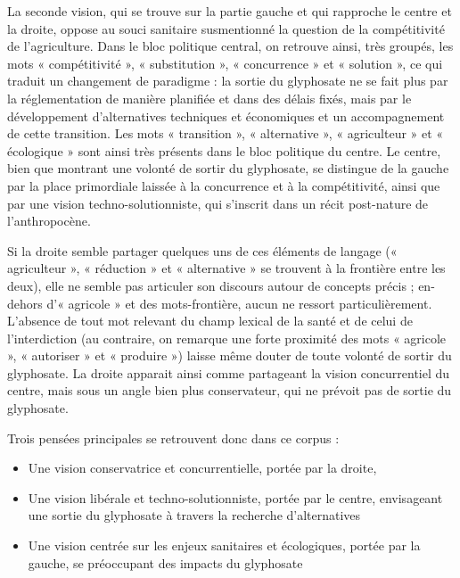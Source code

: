 \documentclass[12pt,twocolumn,landscape]{article}
\begin{document}
    La seconde vision, qui se trouve sur la partie gauche
    et qui rapproche le centre et la droite,
    oppose au souci sanitaire susmentionné la question
    de la compétitivité de l'agriculture.
    Dans le bloc politique central, on retrouve ainsi,
    très groupés, les mots « compétitivité »,
    « substitution », « concurrence » et « solution »,
    ce qui traduit un changement de paradigme :
    la sortie du glyphosate ne se fait plus par la réglementation
    de manière planifiée et dans des délais fixés,
    mais par le développement d'alternatives techniques
    et économiques et un accompagnement de cette transition.
    Les mots « transition », « alternative », « agriculteur »
    et « écologique » sont ainsi très présents
    dans le bloc politique du centre.
    Le centre, bien que montrant une volonté de sortir
    du glyphosate, se distingue de la gauche par
    la place primordiale laissée à la concurrence
    et à la compétitivité, ainsi que par une vision techno-solutionniste,
    qui s'inscrit dans un récit post-nature de l'anthropocène.

    Si la droite semble partager quelques uns de ces éléments de langage
    (« agriculteur », « réduction » et « alternative » se trouvent
    à la frontière entre les deux),
    elle ne semble pas articuler son discours autour
    de concepts précis ;
    en-dehors d'« agricole » et des mots-frontière,
    aucun ne ressort particulièrement.
    L'absence de tout mot relevant du champ lexical de la santé
    et de celui de l'interdiction (au contraire, on
    remarque une forte proximité des mots « agricole »,
    « autoriser » et « produire »)
    laisse même douter de toute volonté de sortir du glyphosate.
    La droite apparait ainsi comme partageant la vision
    concurrentiel du centre, mais sous un angle bien plus conservateur,
    qui ne prévoit pas de sortie du glyphosate.

    Trois pensées principales se retrouvent donc dans ce corpus :

    \begin{itemize}
        \item Une vision conservatrice et concurrentielle, portée
        par la droite,
        \item Une vision libérale et techno-solutionniste, portée par le centre,
        envisageant une sortie du glyphosate à travers la recherche d'alternatives
        \item Une vision centrée sur les enjeux sanitaires et écologiques, portée
        par la gauche, se préoccupant des impacts du glyphosate
    \end{itemize}
\end{document}

